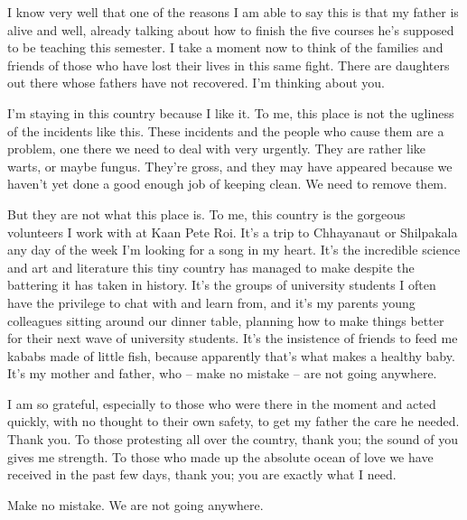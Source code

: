 \documentclass[a4paper,10 pt,addpoints]{exam}
\begin{document}
I know very well that one of the reasons I am able to say this is that my father is alive and well, already talking about how to finish the five courses he's supposed to be teaching this semester. I take a moment now to think of the families and friends of those who have lost their lives in this same fight. There are daughters out there whose fathers have not recovered. I'm thinking about you.

I'm staying in this country because I like it. To me, this place is not the ugliness of the incidents like this. These incidents and the people who cause them are a problem, one there we need to deal with very urgently. They are rather like warts, or maybe fungus. They're gross, and they may have appeared because we haven't yet done a good enough job of keeping clean. We need to remove them.

But they are not what this place is. To me, this country is the gorgeous volunteers I work with at Kaan Pete Roi. It's a trip to Chhayanaut or Shilpakala any day of the week I'm looking for a song in my heart. It's the incredible science and art and literature this tiny country has managed to make despite the battering it has taken in history. It's the groups of university students I often have the privilege to chat with and learn from, and it's my parents young colleagues sitting around our dinner table, planning how to make things better for their next wave of university students. It's the insistence of friends to feed me kababs made of little fish, because apparently that's what makes a healthy baby. It's my mother and father, who – make no mistake – are not going anywhere.

I am so grateful, especially to those who were there in the moment and acted quickly, with no thought to their own safety, to get my father the care he needed. Thank you. To those protesting all over the country, thank you; the sound of you gives me strength. To those who made up the absolute ocean of love we have received in the past few days, thank you; you are exactly what I need.

Make no mistake. We are not going anywhere.
\end{document}
